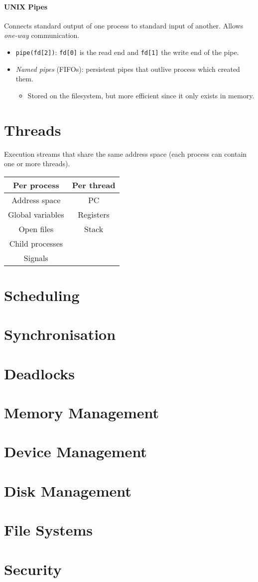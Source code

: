 \documentclass[twocolumn,english]{article}
\providecommand{\tabularnewline}{\\}
\providecommand{\tabularnewline}{\\}
\begin{document}
\paragraph{UNIX Pipes}

Connects standard output of one process to standard input of another.
Allows \emph{one-way} communication.
\begin{itemize}
\item \texttt{pipe(fd{[}2{]})}: \texttt{fd{[}0{]}} is the read end and \texttt{fd{[}1{]}}
the write end of the pipe.
\item \emph{Named pipes} (FIFOs): persistent pipes that outlive process
which created them.
\begin{itemize}
\item Stored on the filesystem, but more efficient since it only exists
in memory.
\end{itemize}
\end{itemize}

\section{Threads}

Execution streams that share the same address space (each process
can contain one or more threads).

\begin{table}[H]
\centering{}%
\begin{tabular}{cc}
\toprule 
\textbf{Per process} & \textbf{Per thread}\tabularnewline
\midrule
Address space & PC\tabularnewline
Global variables & Registers\tabularnewline
Open files & Stack\tabularnewline
Child processes & \tabularnewline
Signals & \tabularnewline
\bottomrule
\end{tabular}
\end{table}

\section{Scheduling}

\section{Synchronisation}

\section{Deadlocks}

\section{Memory Management}

\section{Device Management}

\section{Disk Management}

\section{File Systems}

\section{Security}
\end{document}
